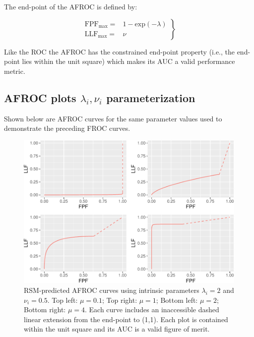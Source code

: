 \documentclass[
]{book}
\begin{document}
The end-point of the AFROC is defined by:

\begin{equation}
\left. 
\begin{aligned}
\text{FPF}_{\text{max}} =& 1 - \text{exp} \left ( -\lambda \right )\\
\text{LLF}_{\text{max}} =& \nu 
\end{aligned}
\right \}
\label{eq:rsm-other-predictions-afroc-end-point}
\end{equation}

Like the ROC the AFROC has the constrained end-point property (i.e., the end-point lies within the unit square) which makes its AUC a valid performance metric.

\hypertarget{afroc-plots-lambda_i-nu_i-parameterization}{%
\subsection{\texorpdfstring{AFROC plots \(\lambda_i, \nu_i\) parameterization}{AFROC plots \textbackslash lambda\_i, \textbackslash nu\_i parameterization}}\label{afroc-plots-lambda_i-nu_i-parameterization}}

Shown below are AFROC curves for the same parameter values used to demonstrate the preceding FROC curves.

\begin{figure}
\centering
\includegraphics{08-rsm-predictions2_files/figure-latex/rsm-other-predictions-afroc-plots-lambdai-nui-1.pdf}
\caption{\label{fig:rsm-other-predictions-afroc-plots-lambdai-nui}RSM-predicted AFROC curves using intrinsic parameters \(\lambda_i = 2\) and \(\nu_i = 0.5\). Top left: \(\mu = 0.1\); Top right: \(\mu = 1\); Bottom left: \(\mu = 2\); Bottom right: \(\mu = 4\). Each curve includes an inaccessible dashed linear extension from the end-point to (1,1). Each plot is contained within the unit square and its AUC is a valid figure of merit.}
\end{figure}
\end{document}
